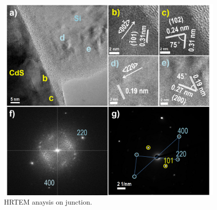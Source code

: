 \begin{figure}  
\includegraphics[width=\textwidth]{figures/figure3_2}
\caption[HRTEM anaysis on junction.]{HRTEM anaysis on junction.
\label{fig:fig3_2}}
\end{figure}



